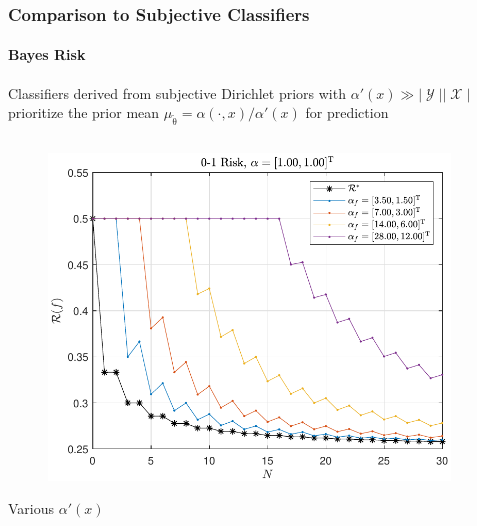 \documentclass{beamer}
\DeclareMathOperator{\Xcal}{\mathcal{X}}
\DeclareMathOperator{\Ycal}{\mathcal{Y}}
\begin{document}
\begin{frame}
\frametitle{Comparison to Subjective Classifiers}
\framesubtitle{Bayes Risk}

Classifiers derived from subjective Dirichlet priors with $\alpha'(x) \gg |\Ycal||\Xcal|$ prioritize the prior mean $\mu_{\tilde{\uptheta}} = \alpha(\cdot,x) / \alpha'(x)$ for prediction

\vspace{-0.5em}
\begin{columns}[c]

\begin{column}{.5\linewidth}

\begin{figure}
\centering
\includegraphics[width=1\linewidth]{Risk_01_Dir_N_leg_f_a0.pdf}
\label{fig:Risk_01_Dir_N_leg_f_a0}
\end{figure}
\vspace{-2.5em}
\centering
\footnotesize
Various $\alpha'(x)$

\end{column}

\begin{column}{.5\linewidth}


\end{column}
\end{columns}
\end{frame}
\end{document}
